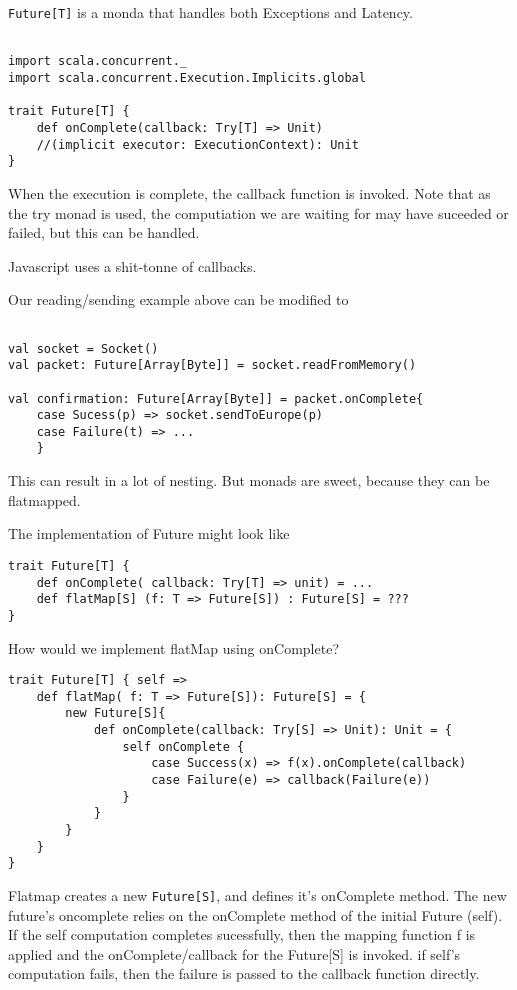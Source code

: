 \lstinline{Future[T]} is a monda that handles both Exceptions and Latency.

\begin{lstlisting}

import scala.concurrent._
import scala.concurrent.Execution.Implicits.global

trait Future[T] {
	def onComplete(callback: Try[T] => Unit)
	//(implicit executor: ExecutionContext): Unit
}
\end{lstlisting}

When the execution is complete, the callback function is invoked. Note that as the try monad is used, the computiation we are waiting for may have suceeded or failed, but this can be handled.

Javascript uses a shit-tonne of callbacks.

Our reading/sending example above can be modified to 
\begin{lstlisting}

val socket = Socket()
val packet: Future[Array[Byte]] = socket.readFromMemory()

val confirmation: Future[Array[Byte]] = packet.onComplete{
	case Sucess(p) => socket.sendToEurope(p)
	case Failure(t) => ...
	}
\end{lstlisting}

This can result in a lot of nesting. But monads are sweet, because they can be flatmapped.

The implementation of Future might look like
\begin{lstlisting}
trait Future[T] {
	def onComplete( callback: Try[T] => unit) = ...
	def flatMap[S] (f: T => Future[S]) : Future[S] = ???
}
\end{lstlisting}
How would we implement flatMap using onComplete? 

\begin{lstlisting}
trait Future[T] { self => 
	def flatMap( f: T => Future[S]): Future[S] = { 
		new Future[S]{
			def onComplete(callback: Try[S] => Unit): Unit = {
				self onComplete {
					case Success(x) => f(x).onComplete(callback)
					case Failure(e) => callback(Failure(e))
				}
			}
		}
	}
}
\end{lstlisting}

Flatmap creates a new \lstinline|Future[S]|, and defines it's onComplete method. The new future's oncomplete relies on the onComplete method of the initial Future (self). If the self computation completes sucessfully, then the mapping function f is applied and the onComplete/callback for the Future[S] is invoked.
if self's computation fails, then the failure is passed to the callback function directly.



